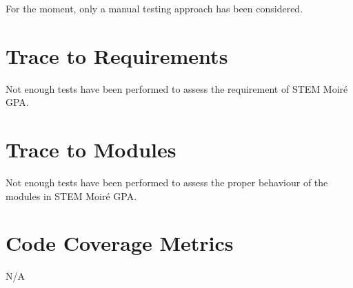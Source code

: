 \documentclass[12pt, titlepage]{article}
\newcommand{\progname}{STEM Moir{\'e} GPA}
\begin{document}
For the moment, only a manual testing approach has been considered.

\section{Trace to Requirements}

Not enough tests have been performed to assess the requirement of \progname{}.
		
\section{Trace to Modules}

Not enough tests have been performed to assess the proper behaviour of the 
modules in \progname{}.		

\section{Code Coverage Metrics}

N/A




\end{document}
